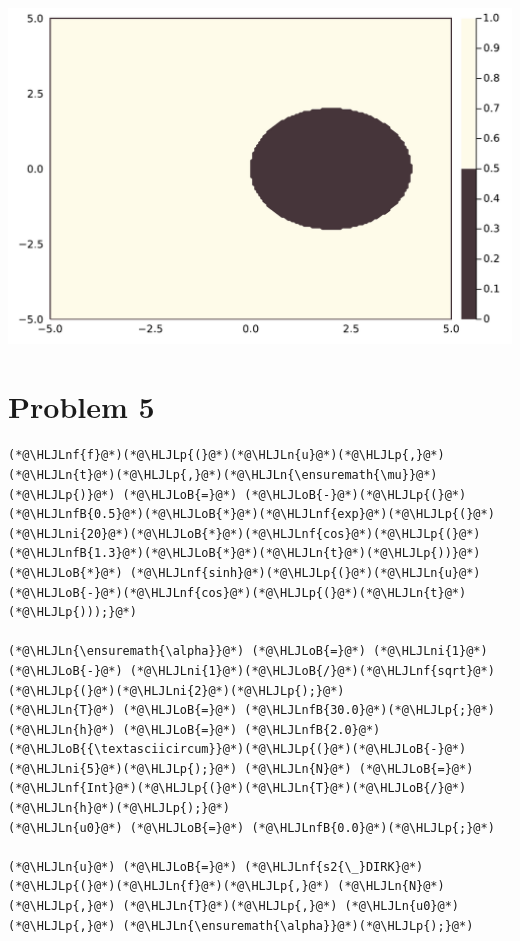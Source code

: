 \documentclass[12pt,a4paper]{article}
\newcommand{\HLJLn}[1]{#1}
\newcommand{\HLJLnf}[1]{\textcolor[RGB]{66,102,213}{#1}}
\newcommand{\HLJLnfB}[1]{\textcolor[RGB]{59,151,46}{#1}}
\newcommand{\HLJLni}[1]{\textcolor[RGB]{59,151,46}{#1}}
\newcommand{\HLJLoB}[1]{\textcolor[RGB]{102,102,102}{\textbf{#1}}}
\newcommand{\HLJLp}[1]{#1}
\begin{document}
\includegraphics[width=\linewidth]{figures/ass_3_report_5_1.pdf}

\section{Problem 5}

\begin{lstlisting}
(*@\HLJLnf{f}@*)(*@\HLJLp{(}@*)(*@\HLJLn{u}@*)(*@\HLJLp{,}@*)(*@\HLJLn{t}@*)(*@\HLJLp{,}@*)(*@\HLJLn{\ensuremath{\mu}}@*)(*@\HLJLp{)}@*) (*@\HLJLoB{=}@*) (*@\HLJLoB{-}@*)(*@\HLJLp{(}@*)(*@\HLJLnfB{0.5}@*)(*@\HLJLoB{*}@*)(*@\HLJLnf{exp}@*)(*@\HLJLp{(}@*)(*@\HLJLni{20}@*)(*@\HLJLoB{*}@*)(*@\HLJLnf{cos}@*)(*@\HLJLp{(}@*)(*@\HLJLnfB{1.3}@*)(*@\HLJLoB{*}@*)(*@\HLJLn{t}@*)(*@\HLJLp{))}@*) (*@\HLJLoB{*}@*) (*@\HLJLnf{sinh}@*)(*@\HLJLp{(}@*)(*@\HLJLn{u}@*)(*@\HLJLoB{-}@*)(*@\HLJLnf{cos}@*)(*@\HLJLp{(}@*)(*@\HLJLn{t}@*)(*@\HLJLp{)));}@*)

(*@\HLJLn{\ensuremath{\alpha}}@*) (*@\HLJLoB{=}@*) (*@\HLJLni{1}@*) (*@\HLJLoB{-}@*) (*@\HLJLni{1}@*)(*@\HLJLoB{/}@*)(*@\HLJLnf{sqrt}@*)(*@\HLJLp{(}@*)(*@\HLJLni{2}@*)(*@\HLJLp{);}@*)
(*@\HLJLn{T}@*) (*@\HLJLoB{=}@*) (*@\HLJLnfB{30.0}@*)(*@\HLJLp{;}@*) (*@\HLJLn{h}@*) (*@\HLJLoB{=}@*) (*@\HLJLnfB{2.0}@*)(*@\HLJLoB{{\textasciicircum}}@*)(*@\HLJLp{(}@*)(*@\HLJLoB{-}@*)(*@\HLJLni{5}@*)(*@\HLJLp{);}@*) (*@\HLJLn{N}@*) (*@\HLJLoB{=}@*) (*@\HLJLnf{Int}@*)(*@\HLJLp{(}@*)(*@\HLJLn{T}@*)(*@\HLJLoB{/}@*)(*@\HLJLn{h}@*)(*@\HLJLp{);}@*)
(*@\HLJLn{u0}@*) (*@\HLJLoB{=}@*) (*@\HLJLnfB{0.0}@*)(*@\HLJLp{;}@*)

(*@\HLJLn{u}@*) (*@\HLJLoB{=}@*) (*@\HLJLnf{s2{\_}DIRK}@*)(*@\HLJLp{(}@*)(*@\HLJLn{f}@*)(*@\HLJLp{,}@*) (*@\HLJLn{N}@*)(*@\HLJLp{,}@*) (*@\HLJLn{T}@*)(*@\HLJLp{,}@*) (*@\HLJLn{u0}@*)(*@\HLJLp{,}@*) (*@\HLJLn{\ensuremath{\alpha}}@*)(*@\HLJLp{);}@*)
\end{lstlisting}
\end{document}

